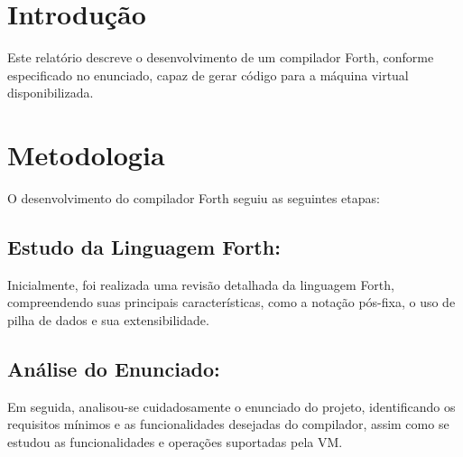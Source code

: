 \documentclass{article}
\begin{document}
    

\section*{Introdução}

\vspace{0.5cm}
        
Este relatório descreve o desenvolvimento de um compilador Forth, conforme especificado no enunciado, capaz de gerar código para a máquina virtual disponibilizada.

\vspace{1cm}

\section*{Metodologia}

\vspace{0.5cm}

O desenvolvimento do compilador Forth seguiu as seguintes etapas:

\vspace{0.5cm}

    \subsection*{Estudo da Linguagem Forth:}   

        \vspace{0.5cm}
        
        Inicialmente, foi realizada uma revisão detalhada da linguagem Forth, compreendendo suas principais características, como a notação pós-fixa, o uso de pilha de dados e sua extensibilidade.

        \vspace{0.5cm}
    
    \subsection*{Análise do Enunciado:} 

        \vspace{0.5cm}
    
        Em seguida, analisou-se cuidadosamente o enunciado do projeto, identificando os requisitos mínimos e as funcionalidades desejadas do compilador, assim como se estudou as funcionalidades e operações suportadas pela VM.

        \vspace{0.5cm}
    
\end{document}
